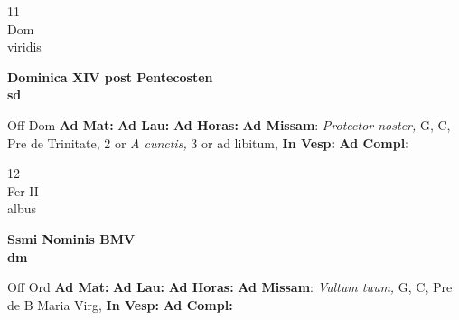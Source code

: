 \documentclass[10pt, openany]{book}
\begin{document}
        \begin{center}
            \begin{minipage}{3.5in}
                \vspace{2em}
                \begin{minipage}{0.5in}
                    {\Huge 11} \\
                    {\normalsize Dom} \\
                    {\normalsize viridis}
                \end{minipage}
                \begin{minipage}{3.0in}
                    \textbf{ \large Dominica XIV post Pentecosten \\
                    \textnormal{\normalsize sd}} \\ 
                \end{minipage}
                \begin{justify}Off Dom
                    \textbf{Ad Mat: }
                    \textbf{Ad Lau: }
                    \textbf{Ad Horas: }\textbf{Ad Missam}: \textit{Protector noster,} G, C, Pre de Trinitate, 2 or \textit{A cunctis,} 3 or ad libitum,  
                    \textbf{In Vesp: }
                    \textbf{Ad Compl: }
                \end{justify}
            \end{minipage}
        \end{center}
    
        \begin{center}
            \begin{minipage}{3.5in}
                \vspace{2em}
                \begin{minipage}{0.5in}
                    {\Huge 12} \\
                    {\normalsize Fer II} \\
                    {\normalsize albus}
                \end{minipage}
                \begin{minipage}{3.0in}
                    \textbf{ \large Ssmi Nominis BMV \\
                    \textnormal{\normalsize dm}} \\ 
                \end{minipage}
                \begin{justify}Off Ord
                    \textbf{Ad Mat: }
                    \textbf{Ad Lau: }
                    \textbf{Ad Horas: }\textbf{Ad Missam}: \textit{Vultum tuum,} G, C, Pre de B Maria Virg,  
                    \textbf{In Vesp: }
                    \textbf{Ad Compl: }
                \end{justify}
            \end{minipage}
        \end{center}
    
\end{document}
